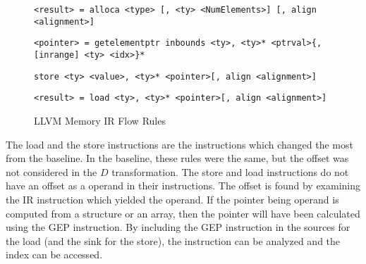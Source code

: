 \begin{figure}[h!]
  \hrulefill
  \begin{lstlisting}[style=nolinenumberstyle]
<result> = alloca <type> [, <ty> <NumElements>] [, align <alignment>]
  \end{lstlisting}


  \begin{lstlisting}[style=nolinenumberstyle]
<pointer> = getelementptr inbounds <ty>, <ty>* <ptrval>{, [inrange] <ty> <idx>}*
  \end{lstlisting}


  \begin{lstlisting}[style=nolinenumberstyle]
store <ty> <value>, <ty>* <pointer>[, align <alignment>]
  \end{lstlisting}


  \begin{lstlisting}[style=nolinenumberstyle]
<result> = load <ty>, <ty>* <pointer>[, align <alignment>]
  \end{lstlisting}

  \hrulefill
  \caption{LLVM Memory IR Flow Rules}
  \label{fig:llvm-mem-ir}
\end{figure}

The load and the store instructions are the instructions which changed the most
from the baseline. In the baseline, these rules were the same, but the offset
was not considered in the $D$ transformation. The store and load instructions do
not have an offset as a operand in their instructions. The offset is found  by
examining the IR instruction which yielded the operand. If the pointer being
operand is computed from a structure or an array, then the pointer will have
been calculated using the GEP instruction. By including the GEP instruction in
the sources for the load (and the sink for the store), the instruction can be
analyzed and the index can be accessed.


